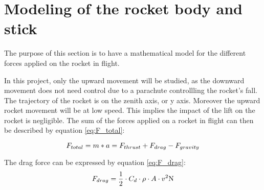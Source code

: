 %			
%			
		
		\section{Modeling of the rocket body and stick}
			
		The purpose of this section is to have a mathematical model for the different forces applied on the rocket in flight. 
		
		In this project, only the upward movement will be studied, as the downward movement does not need control due to a parachute controllling the rocket's fall. The trajectory of the rocket is on the zenith axis, or y axis.   Moreover the upward rocket movement will be at low speed. This implies the impact of the lift on the rocket is negligible. The sum of the forces applied on a rocket in flight can then be described by equation \vref{eq:F_total}:
		
		\begin{equation}
		F_{total} = m*a = F_{thrust} + F_{drag} - F_{gravity} \addunit{\newton} \label{eq:F_{total}}
		\end{equation}
		\startexplain
		\stopexplain
		
		The drag force can be expressed by equation \vref{eq:F_drag}:
		\begin{equation}
		F_{drag} = \frac{1}{2} \cdot C_{d} \cdot \rho \cdot A \cdot v^2 \si{\newton} \label{eq:F_{drag}}
		\end{equation}
		\startexplain
		\stopexplain
			

